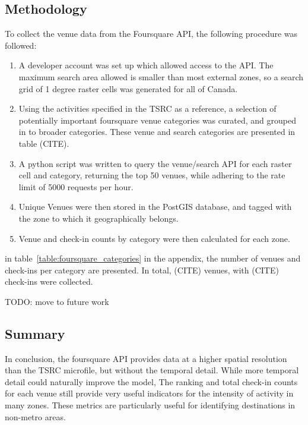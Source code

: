 \subsection{Methodology}
To collect the venue data from the Foursquare API, the following procedure was followed:
\begin{enumerate}

\item A developer account was set up which allowed access to the API. The maximum search area allowed is smaller than most external zones, so a search grid of 1 degree raster cells was generated for all of Canada. 
\item Using the activities specified in the TSRC as a reference, a selection of potentially important foursquare venue categories was curated, and grouped in to broader categories. These venue and search categories are presented in table (CITE). 


\item A python script was written to query the venue/search API for each raster cell and category, returning the top 50 venues, while adhering to the rate limit of 5000 requests per hour. 
\item Unique Venues were then stored in the PostGIS database, and tagged with the zone to which it geographically belongs.
\item Venue and check-in counts by category were then calculated for each zone.
\end{enumerate}

in table~\ref{table:foursquare_categories} in the appendix, the number of venues and check-ins per category are presented. In total, (CITE) venues, with (CITE) check-ins were collected.



TODO: move to future work
\subsection{Summary}
In conclusion, the foursquare API provides data at a higher spatial resolution than the TSRC microfile, but without the temporal detail. While more temporal detail could naturally improve the model, The ranking and total check-in counts for each venue still provide very useful indicators for the intensity of activity in many zones. These metrics are particularly useful for identifying destinations in non-metro areas.